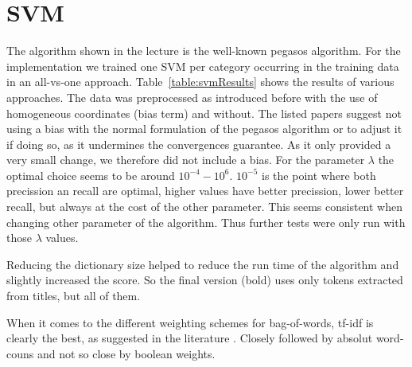 \documentclass{article}
\begin{document}
\vspace{-2mm}
\section*{SVM}
The algorithm shown in the lecture is the well-known pegasos algorithm\cite{shalev-shwartz_pegasos:_2011,shalev-shwartz_pegasos:_????}. For the implementation we trained one SVM per category occurring in the training data in an all-vs-one approach.
Table~\ref{table:svmResults} shows the results of various approaches.
The data was preprocessed as introduced before with the use of homogeneous coordinates (bias term) and without. The listed papers suggest not using a bias with the normal formulation of the pegasos algorithm or to adjust it if doing so, as it undermines the convergences guarantee. As it only provided a very small change, we therefore did not include a bias. For the parameter $\lambda$ the optimal choice seems to be around $10^{-4} - 10^{6}$. $10^{-5}$ is the point where both precission an recall are optimal, higher values have better precission, lower better recall, but always at the cost of the other parameter. This seems consistent when changing other parameter of the algorithm. Thus further tests were only run with those $\lambda$ values.

Reducing the dictionary size helped to reduce the run time of the algorithm and slightly increased the score. So the final version (bold) uses only tokens extracted from titles, but all of them.

When it comes to the different weighting schemes for bag-of-words, tf-idf is clearly the best, as suggested in the literature \cite{ozgur_text_2005}. Closely followed by absolut word-couns and not so close by boolean weights.
\end{document}
